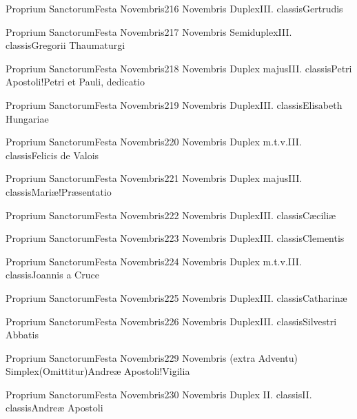 \documentclass[nocturnale-romanum.tex]{subfiles}
\begin{document}
	{Proprium Sanctorum}{Festa Novembris}{2}{16 Novembris}
	{Duplex}{III. classis}{Gertrudis}
	{}
	{}

	{Proprium Sanctorum}{Festa Novembris}{2}{17 Novembris}
	{Semiduplex}{III. classis}{Gregorii Thaumaturgi}
	{}
	{}

	{Proprium Sanctorum}{Festa Novembris}{2}{18 Novembris}
	{Duplex majus}{III. classis}{Petri Apostoli!Petri et Pauli, dedicatio}
	{}
	{}

	{Proprium Sanctorum}{Festa Novembris}{2}{19 Novembris}
	{Duplex}{III. classis}{Elisabeth Hungariae}
	{}
	{}

	{Proprium Sanctorum}{Festa Novembris}{2}{20 Novembris}
	{Duplex m.t.v.}{III. classis}{Felicis de Valois}
	{}
	{}

	{Proprium Sanctorum}{Festa Novembris}{2}{21 Novembris}
	{Duplex majus}{III. classis}{Mariæ!Præsentatio}
	{}
	{}

	{Proprium Sanctorum}{Festa Novembris}{2}{22 Novembris}
	{Duplex}{III. classis}{Cæciliæ}
	{}
	{}

	{Proprium Sanctorum}{Festa Novembris}{2}{23 Novembris}
	{Duplex}{III. classis}{Clementis}
	{}
	{}

	{Proprium Sanctorum}{Festa Novembris}{2}{24 Novembris}
	{Duplex m.t.v.}{III. classis}{Joannis a Cruce}
	{}
	{}

	{Proprium Sanctorum}{Festa Novembris}{2}{25 Novembris}
	{Duplex}{III. classis}{Catharinæ}
	{}
	{}

	{Proprium Sanctorum}{Festa Novembris}{2}{26 Novembris}
	{Duplex}{III. classis}{Silvestri Abbatis}
	{}
	{}

	{Proprium Sanctorum}{Festa Novembris}{2}{29 Novembris (extra Adventu)}
	{Simplex}{(Omittitur)}{Andreæ Apostoli!Vigilia}
	{}
	{}
\invitferia

	{Proprium Sanctorum}{Festa Novembris}{2}{30 Novembris}
	{Duplex II. classis}{II. classis}{Andreæ Apostoli}
	{}
	{}
\end{document}
